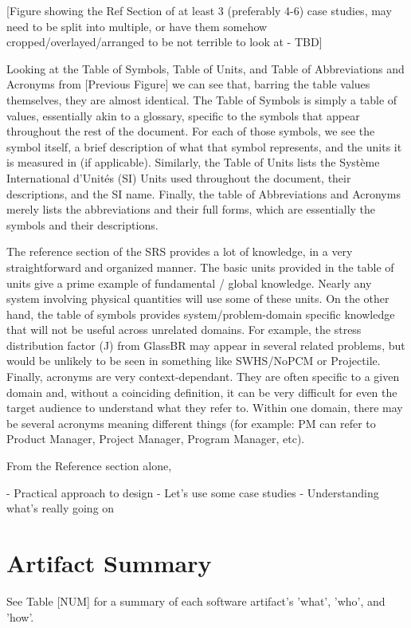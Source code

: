 [Figure showing the Ref Section of at least 3 (preferably 4-6) case studies, may
need to be split into multiple, or have them somehow cropped/overlayed/arranged
to be not terrible to look at - TBD]

Looking at the Table of Symbols, Table of Units, and Table of Abbreviations and 
Acronyms from [Previous Figure] we can see that, barring the table values 
themselves, they are almost identical. The Table of Symbols is simply a table 
of values, essentially akin to a glossary, specific to the symbols that appear 
throughout the rest of the document. For each of those symbols, we see the 
symbol itself, a brief description of what that symbol represents, and the units
it is measured in (if applicable). Similarly, the Table of Units lists the
Système International d’Unités (SI) Units used throughout the document, their
descriptions, and the SI name. Finally, the table of Abbreviations and Acronyms
merely lists the abbreviations and their full forms, which are essentially the
symbols and their descriptions.

The reference section of the SRS provides a lot of knowledge, in a very 
straightforward and organized manner. The basic units provided in the table of 
units give a prime example of fundamental / global knowledge. Nearly any system
involving physical quantities will use some of these units. On the other hand, 
the table of symbols provides system/problem-domain specific knowledge that
will not be useful across unrelated domains. For example, the stress 
distribution factor (J) from GlassBR may appear in several related problems, but
would be unlikely to be seen in something like SWHS/NoPCM or Projectile. 
Finally, acronyms are very context-dependant. They are often specific to a
given domain and, without a coinciding definition, it can be very difficult for
even the target audience to understand what they refer to. Within one domain, 
there may be several acronyms meaning different things (for example: PM can 
refer to Product Manager, Project Manager, Program Manager, etc).

From the Reference section alone, 


- Practical approach to design
- Let's use some case studies
- Understanding what's really going on

\section{Artifact Summary}

See Table [NUM] for a summary of each software artifact's 'what', 'who', and
'how'.


